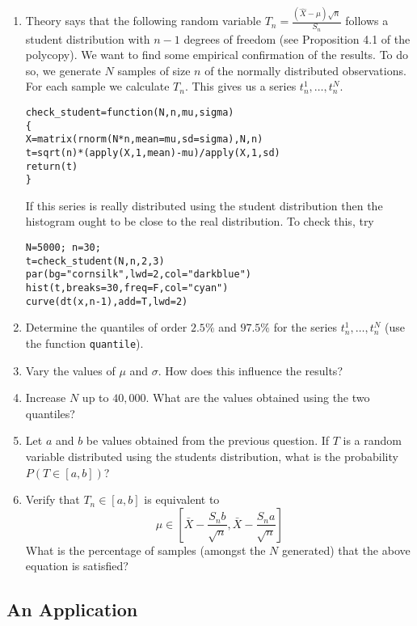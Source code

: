 \documentclass[a4paper,10pt]{article}
\begin{document}
\begin{enumerate}
 \item Theory says that the following random variable $T_n = \frac{(\hat{X}-\mu)\sqrt{n}}{S_n}$ follows a student distribution with $n-1$ degrees of freedom (see Proposition 4.1 of the polycopy). We want to find some empirical confirmation of the results. To do so, we generate $N$ samples of size $n$ of the normally distributed observations. For each sample we calculate $T_n$. This gives us a series $t_n^1, \ldots, t_n^N$. 
\begin{lstlisting}
check_student=function(N,n,mu,sigma)
{
X=matrix(rnorm(N*n,mean=mu,sd=sigma),N,n)
t=sqrt(n)*(apply(X,1,mean)-mu)/apply(X,1,sd)
return(t)
} 
\end{lstlisting}
If this series is really distributed using the student distribution then the histogram ought to be close to the real distribution. To check this, try 
\begin{lstlisting}
N=5000; n=30;
t=check_student(N,n,2,3)
par(bg="cornsilk",lwd=2,col="darkblue")
hist(t,breaks=30,freq=F,col="cyan")
curve(dt(x,n-1),add=T,lwd=2)
\end{lstlisting}

\item Determine the quantiles of order $2.5\%$ and $97.5\%$ for the series $t_n^1, \ldots, t_n^N$ (use the function \texttt{quantile}). 
\item Vary the values of $\mu$ and $\sigma$. How does this influence the results? 
\item Increase $N$ up to $40,000$. What are the values obtained using the two quantiles? 
\item Let $a$ and $b$ be values obtained from the previous question. If $T$ is a random variable distributed using the students distribution, what is the probability $P(T \in [a, b])$? 
\item Verify that $T_n \in [a, b]$ is equivalent to 
\begin{equation}
\mu \in \left[\bar{X} - \frac{S_n b}{\sqrt{n}}, \bar{X} - \frac{S_n a}{\sqrt{n}} \right] \label{eqn:student} 
\end{equation}
What is the percentage of samples (amongst the $N$ generated) that the above equation is satisfied? 
\end{enumerate}

\subsection{An Application}
\end{document}
